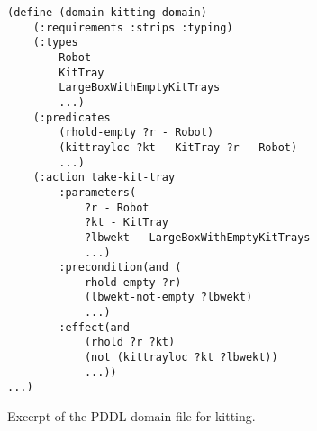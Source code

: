 \begin{figure}[h!]
\centering
\begin{minipage}{.5\paperwidth}
\begin{mylisting}
\begin{Verbatim}[commandchars=\\\{\},commandchars=+\[\],fontsize=\scriptsize,numbersep=3pt]
(define (domain kitting-domain)
    (:requirements :strips :typing)
    (:types
        Robot
        KitTray
        LargeBoxWithEmptyKitTrays
        ...)
    (:predicates
        (rhold-empty ?r - Robot)
        (kittrayloc ?kt - KitTray ?r - Robot)		
        ...)
    (:action take-kit-tray
        :parameters(
            ?r - Robot
            ?kt - KitTray
            ?lbwekt - LargeBoxWithEmptyKitTrays
            ...)
        :precondition(and (
            rhold-empty ?r)
            (lbwekt-not-empty ?lbwekt)
            ...)
        :effect(and
            (rhold ?r ?kt)
            (not (kittrayloc ?kt ?lbwekt))
            ...))
...)
\end{Verbatim}
\end{mylisting}
\end{minipage}
\caption{Excerpt of the PDDL domain file for kitting.\label{fig:domainfile}}
\vspace{-.15in}
\end{figure}


